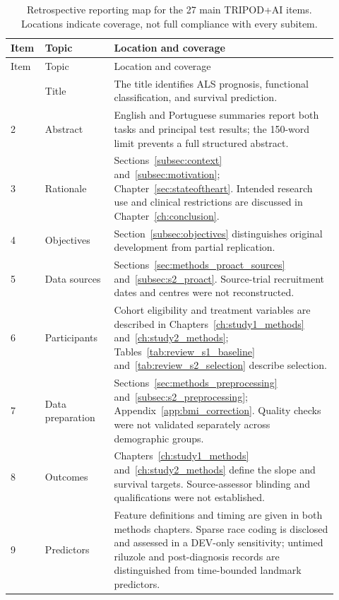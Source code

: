 \begingroup
\small
\setlength{\tabcolsep}{4pt}
\begin{longtable}{@{}p{0.07\linewidth}p{0.20\linewidth}p{0.65\linewidth}@{}}
\caption[Retrospective TRIPOD+AI reporting checklist]{Retrospective reporting map for the 27 main TRIPOD+AI items. Locations indicate coverage, not full compliance with every subitem.}\label{tab:tripod_checklist}\\
\toprule
Item & Topic & Location and coverage \\
\midrule
\endfirsthead
\toprule
Item & Topic & Location and coverage \\
\midrule
\endhead
\bottomrule
\endfoot
1 & Title & The title identifies ALS prognosis, functional classification, and survival prediction. \\
2 & Abstract & English and Portuguese summaries report both tasks and principal test results; the 150-word limit prevents a full structured abstract. \\
3 & Rationale & Sections~\ref{subsec:context} and~\ref{subsec:motivation}; Chapter~\ref{sec:stateoftheart}. Intended research use and clinical restrictions are discussed in Chapter~\ref{ch:conclusion}. \\
4 & Objectives & Section~\ref{subsec:objectives} distinguishes original development from partial replication. \\
5 & Data sources & Sections~\ref{sec:methods_proact_sources} and~\ref{subsec:s2_proact}. Source-trial recruitment dates and centres were not reconstructed. \\
6 & Participants & Cohort eligibility and treatment variables are described in Chapters~\ref{ch:study1_methods} and~\ref{ch:study2_methods}; Tables~\ref{tab:review_s1_baseline} and~\ref{tab:review_s2_selection} describe selection. \\
7 & Data preparation & Sections~\ref{sec:methods_preprocessing} and~\ref{subsec:s2_preprocessing}; Appendix~\ref{app:bmi_correction}. Quality checks were not validated separately across demographic groups. \\
8 & Outcomes & Chapters~\ref{ch:study1_methods} and~\ref{ch:study2_methods} define the slope and survival targets. Source-assessor blinding and qualifications were not established. \\
9 & Predictors & Feature definitions and timing are given in both methods chapters. Sparse race coding is disclosed and assessed in a DEV-only sensitivity; untimed riluzole and post-diagnosis records are distinguished from time-bounded landmark predictors. \\

\end{longtable}
